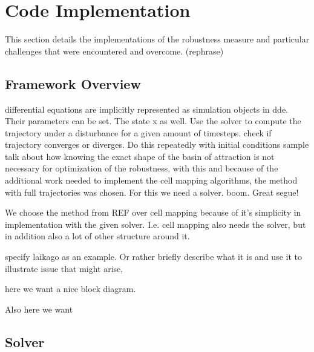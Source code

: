 


    


\section{Code Implementation}

This section details the implementations of the robustness measure and particular challenges that were encountered and overcome. (rephrase)

\subsection{Framework Overview}

differential equations are implicitly represented as simulation objects in dde. Their parameters can be set. The state x as well. Use the solver to compute the trajectory under a disturbance for a given amount of timesteps. check if trajectory converges or diverges. Do this repeatedly with initial conditions sample
talk about how knowing the exact shape of the basin of attraction is not necessary for optimization of the robustness, with this and because of the additional work needed to implement the cell mapping algorithms, the method with full trajectories was chosen. For this we need a solver. boom. Great segue!

We choose the method from REF over cell mapping because of it's simplicity in implementation with the given solver. 
I.e. cell mapping also needs the solver, but in addition also a lot of other structure around it. 

specify laikago as an example. Or rather briefly describe what it is and use it to illustrate issue that might arise, 

here we want a nice block diagram. 

Also here we want

\subsection{Solver}

